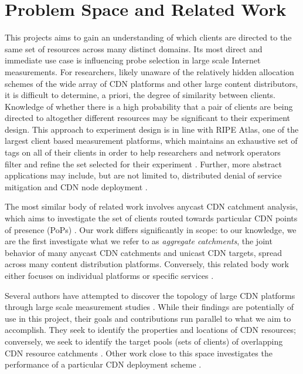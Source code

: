 \section{Problem Space and Related Work} \label{skyspace}

This projects aims to gain an understanding of which clients are directed to the same set of
resources across many distinct domains. Its most direct and immediate use case is influencing probe
selection in large scale Internet measurements. For researchers, likely unaware of the relatively
hidden allocation schemes of the wide array of CDN platforms and other large content distributors,
it is difficult to determine, a priori, the degree of similarity between clients. Knowledge of
whether there is a high probability that a pair of clients are being directed to altogether
different resources may be significant to their experiment design. This approach to experiment
design is in line with RIPE Atlas, one of the largest client based measurement platforms,
which maintains
an exhaustive set of tags on all of their clients in order to help researchers and network operators
filter and refine the set selected for their experiment \cite{ripe-atlas}. Further, more abstract
applications may include, but are not limited to, distributed denial of service mitigation
\cite{anycastvsddos} and CDN node deployment \cite{35590, Tariq}.

The most similar body of related work involves anycast CDN catchment analysis, which aims to
investigate the set of clients routed towards particular CDN points of presence (PoPs)
\cite{Calder2015, anycastvsddos, vdmscatchment}. Our work differs significantly in scope: to our 
knowledge, we are the first investigate what we refer to as \emph{aggregate catchments}, the joint
behavior of many anycast CDN catchments and unicast CDN targets, spread across many content
distribution platforms. Conversely, this related body work either focuses on individual platforms or
specific services \cite{Calder2015, anycastvsddos, vdmscatchment}. 

Several authors have attempted to discover the topology of large CDN platforms through large scale
measurement studies \cite{webcart, Calder2013, benson11}. While their findings are potentially of
use in this project, their goals and contributions run parallel to what we aim to accomplish. They
seek to identify the properties and locations of CDN resources; conversely, we seek to identify the
target pools (sets of clients) of overlapping CDN resource catchments \cite{webcart, Calder2013,
benson11}. Other work close to this space investigates the performance of a particular CDN
deployment scheme \cite{ecs15sigcomm}.
